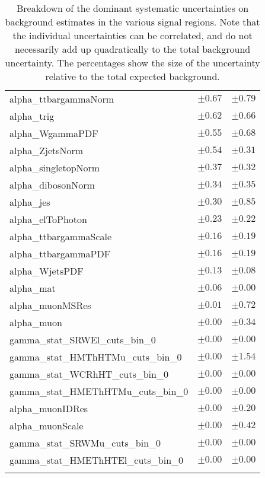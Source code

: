 \begin{table}
\begin{center}
\begin{tabular*}{\textwidth}{@{\extracolsep{\fill}}lcc}
alpha\_ttbargammaNorm         & $\pm 0.67$          & $\pm 0.79$       \\
alpha\_trig         & $\pm 0.62$          & $\pm 0.66$       \\
alpha\_WgammaPDF         & $\pm 0.55$          & $\pm 0.68$       \\
alpha\_ZjetsNorm         & $\pm 0.54$          & $\pm 0.31$       \\
alpha\_singletopNorm         & $\pm 0.37$          & $\pm 0.32$       \\
alpha\_dibosonNorm         & $\pm 0.34$          & $\pm 0.35$       \\
alpha\_jes         & $\pm 0.30$          & $\pm 0.85$       \\
alpha\_elToPhoton         & $\pm 0.23$          & $\pm 0.22$       \\
alpha\_ttbargammaScale         & $\pm 0.16$          & $\pm 0.19$       \\
alpha\_ttbargammaPDF         & $\pm 0.16$          & $\pm 0.19$       \\
alpha\_WjetsPDF         & $\pm 0.13$          & $\pm 0.08$       \\
alpha\_mat         & $\pm 0.06$          & $\pm 0.00$       \\
alpha\_muonMSRes         & $\pm 0.01$          & $\pm 0.72$       \\
alpha\_muon         & $\pm 0.00$          & $\pm 0.34$       \\
gamma\_stat\_SRWEl\_cuts\_bin\_0         & $\pm 0.00$          & $\pm 0.00$       \\
gamma\_stat\_HMThHTMu\_cuts\_bin\_0         & $\pm 0.00$          & $\pm 1.54$       \\
gamma\_stat\_WCRhHT\_cuts\_bin\_0         & $\pm 0.00$          & $\pm 0.00$       \\
gamma\_stat\_HMEThHTMu\_cuts\_bin\_0         & $\pm 0.00$          & $\pm 0.00$       \\
alpha\_muonIDRes         & $\pm 0.00$          & $\pm 0.20$       \\
alpha\_muonScale         & $\pm 0.00$          & $\pm 0.42$       \\
gamma\_stat\_SRWMu\_cuts\_bin\_0         & $\pm 0.00$          & $\pm 0.00$       \\
gamma\_stat\_HMEThHTEl\_cuts\_bin\_0         & $\pm 0.00$          & $\pm 0.00$       \\
\noalign{\smallskip}\hline\noalign{\smallskip}
\end{tabular*}
\end{center}
\caption[Breakdown of uncertainty on background estimates]{
Breakdown of the dominant systematic uncertainties on background estimates in the various signal regions.
Note that the individual uncertainties can be correlated, and do not necessarily add up quadratically to 
the total background uncertainty. The percentages show the size of the uncertainty relative to the total expected background.
\label{table.results.bkgestimate.uncertainties.HMThHTEl_HMThHTMu}}
\end{table}
%